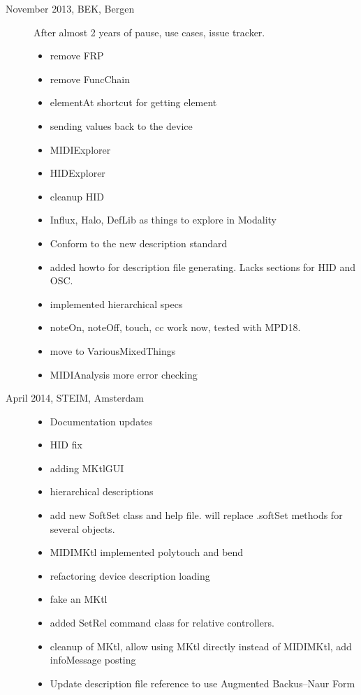 \documentclass{article}
\begin{document}
\begin{description}
	\item[November 2013, BEK, Bergen] After almost 2 years of pause, 
		use cases, issue tracker.
		\begin{itemize}
		\item remove FRP
		\item remove FuncChain
		\item elementAt shortcut for getting element
		\item sending values back to the device
		\item MIDIExplorer
		\item HIDExplorer
		\item cleanup HID
		\item Influx, Halo, DefLib as things to explore in Modality
		\item Conform to the new description standard
		\item added howto for description file generating. Lacks sections for HID and OSC.
		\item implemented hierarchical specs
		\item noteOn, noteOff, touch, cc work now, tested with MPD18.
		\item move to VariousMixedThings
		\item MIDIAnalysis more error checking
	\end{itemize}
		
		
		
	\item[April 2014, STEIM, Amsterdam]
	\begin{itemize}
		\item Documentation updates
		\item HID fix
		\item adding MKtlGUI
		\item hierarchical descriptions
		\item add new SoftSet class and help file. will replace .softSet methods for several objects.
		\item MIDIMKtl implemented polytouch and bend
		\item refactoring device description loading
		\item fake an MKtl
		\item added SetRel command class for relative controllers.
		\item cleanup of MKtl, allow using MKtl directly instead of MIDIMKtl, add infoMessage posting
		\item Update description file reference to use Augmented Backus–Naur Form
	\end{itemize}
\end{description}
\end{document}
